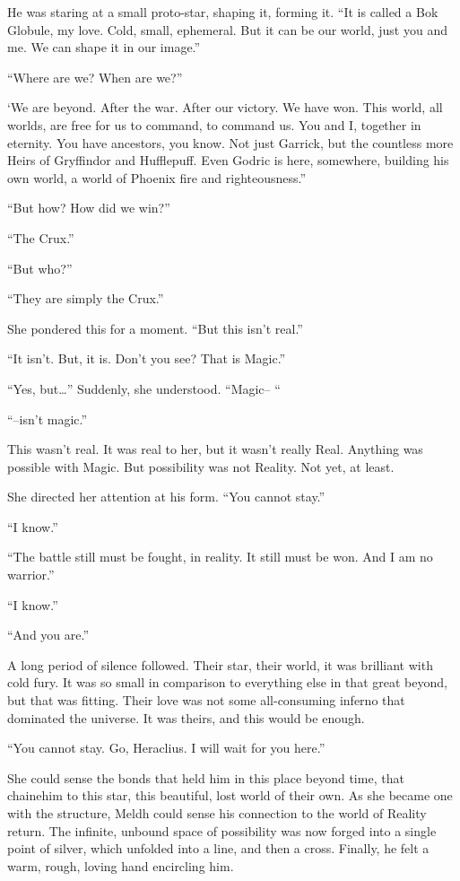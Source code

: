 He was staring at a small proto-star, shaping it, forming it. “It is called a Bok Globule, my love. Cold, small, ephemeral. But it can be our world, just you and me. We can shape it in our image.”

“Where are we? When are we?”

‘We are beyond. After the war. After our victory. We have won. This world, all worlds, are free for us to command, to command us. You and I, together in eternity. You have ancestors, you know. Not just Garrick, but the countless more Heirs of Gryffindor and Hufflepuff. Even Godric is here, somewhere, building his own world, a world of Phoenix fire and righteousness.”

“But how? How did we win?”

“The Crux.”

“But who?”

“They are simply the Crux.”

She pondered this for a moment. “But this isn’t real.”

“It isn’t. But, it is. Don’t you see? That is Magic.”

“Yes, but…” Suddenly, she understood. “Magic– “

“–isn’t magic.”

This wasn’t real. It was real to her, but it wasn’t really Real. Anything was possible with Magic. But possibility was not Reality. Not yet, at least.

She directed her attention at his form. “You cannot stay.”

“I know.”

“The battle still must be fought, in reality. It still must be won. And I am no warrior.”

“I know.”

“And you are.”

A long period of silence followed. Their star, their world, it was brilliant with cold fury. It was so small in comparison to everything else in that great beyond, but that was fitting. Their love was not some all-consuming inferno that dominated the universe. It was theirs, and this would be enough.

“You cannot stay. Go, Heraclius. I will wait for you here.”

She could sense the bonds that held him in this place beyond time, that chainehim to this star, this beautiful, lost world of their own. As she became one with the structure, Meldh could sense his connection to the world of Reality return. The infinite, unbound space of possibility was now forged into a single point of silver, which unfolded into a line, and then a cross. Finally, he felt a warm, rough, loving hand encircling him.

